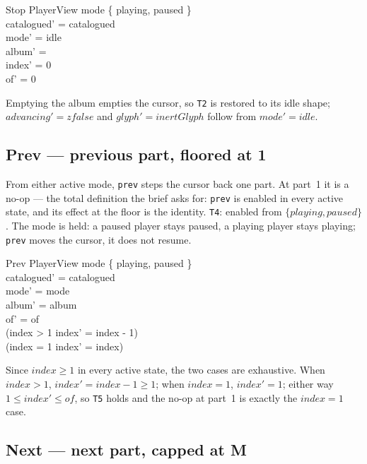 \documentclass[a4paper,10pt,fleqn]{article}
\begin{document}
\begin{schema}{Stop}
  \Delta PlayerView
  \where
  mode \in \{ playing, paused \} \\
  catalogued' = catalogued \\
  mode' = idle \\
  album' = \emptyset \\
  index' = 0 \\
  of' = 0
\end{schema}

Emptying the album empties the cursor, so \texttt{T2} is restored to its idle
shape; $advancing' = zfalse$ and $glyph' = inertGlyph$ follow from $mode' =
idle$.

\subsection{Prev --- previous part, floored at 1}
\label{sec:prev}

From either active mode, \texttt{prev} steps the cursor back one part. At part~1
it is a no-op --- the total definition the brief asks for: \texttt{prev} is
enabled in every active state, and its effect at the floor is the identity.
\texttt{T4}: enabled from $\{ playing, paused \}$. The mode is held: a paused
player stays paused, a playing player stays playing; \texttt{prev} moves the
cursor, it does not resume.

\begin{schema}{Prev}
  \Delta PlayerView
  \where
  mode \in \{ playing, paused \} \\
  catalogued' = catalogued \\
  mode' = mode \\
  album' = album \\
  of' = of \\
  (index > 1 \implies index' = index - 1) \\
  (index = 1 \implies index' = index)
\end{schema}

Since $index \geq 1$ in every active state, the two cases are exhaustive. When
$index > 1$, $index' = index - 1 \geq 1$; when $index = 1$, $index' = 1$; either
way $1 \leq index' \leq of$, so \texttt{T5} holds and the no-op at part~1 is
exactly the $index = 1$ case.

\subsection{Next --- next part, capped at M}
\label{sec:next}
\end{document}
